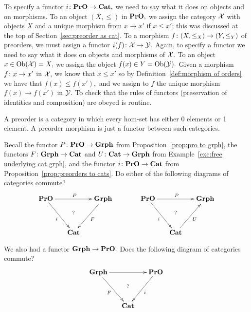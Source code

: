 \documentclass[../main/CT4S-EN-RU]{subfiles}
\begin{document}
\begin{propositionRUS}\label{prop:preorders to cats}
\end{propositionRUS}

\begin{proofENG}
To specify a functor $i\colon{\mathbf{PrO}}\rightarrow{\mathbf{Cat}},$ we need to say what it does on objects and on morphisms. To an object $(X,\leq)$ in ${\mathbf{PrO}},$ we assign the category $\mathcal{X}$ with objects $X$ and a unique morphism from $x\to x'$ if $x\leq x'$; this was discussed at the top of Section~\ref{sec:preorder as cat}. To a morphism $f\colon(X,\leq_X)\rightarrow(Y,\leq_Y)$ of preorders, we must assign a functor $i(f)\colon\mathcal{X}\rightarrow\mathcal{Y}.$ Again, to specify a functor we need to say what it does on objects and morphisms of $\mathcal{X}.$ To an object $x\in\operatorname{Ob}(\mathcal{X})=X,$ we assign the object $f(x)\in Y=\operatorname{Ob}(\mathcal{Y}).$ Given a morphism $f\colon x\rightarrow x'$ in $\mathcal{X},$ we know that $x\leq x'$ so by Definition~\ref{def:morphism of orders} we have that $f(x)\leq f(x'),$ and we assign to $f$ the unique morphism $f(x)\to f(x')$ in $\mathcal{Y}.$ To check that the rules of functors (preservation of identities and composition) are obeyed is routine.
\end{proofENG}

\begin{proofRUS}
\end{proofRUS}

\begin{sloganENG}
A preorder is a category in which every hom-set has either 0 elements or 1 element. A preorder morphism is just a functor between such categories.
\end{sloganENG}

\begin{sloganRUS}
\end{sloganRUS}

\begin{exerciseENG}
Recall the functor $P\colon{\mathbf{PrO}}\rightarrow{\mathbf{Grph}}$ from Proposition~\ref{prop:pro to grph}, the functors $F\colon{\mathbf{Grph}}\rightarrow{\mathbf{Cat}}$ and $U\colon{\mathbf{Cat}}\rightarrow{\mathbf{Grph}}$ from Example~\ref{exc:free underlying cat grph}, and the functor $i\colon{\mathbf{PrO}}\rightarrow{\mathbf{Cat}}$ from Proposition~\ref{prop:preorders to cats}.
\sexc Do either of the following diagrams of categories commute?
$$
\xymatrix@=15pt{\PrO\ar[rr]^P\ar[rdd]_i&\ar@{}[dd]|(.4)?&\Grph\ar[ldd]^F\\\\&\Cat}
\hspace{.5in}
\xymatrix@=15pt{\PrO\ar[rr]^P\ar[rdd]_i&\ar@{}[dd]|(.4)?&\Grph\\\\&\Cat\ar[uur]_U}
$$
\item We also had a functor ${\mathbf{Grph}}\rightarrow{\mathbf{PrO}}.$ Does the following diagram of categories commute?
$$
\xymatrix@=15pt{\Grph\ar[rr]\ar[rdd]_F&\ar@{}[dd]|(.4)?&\PrO\ar[ldd]^i\\\\&\Cat}
$$
\endsexc
\end{exerciseENG}
\end{document}
